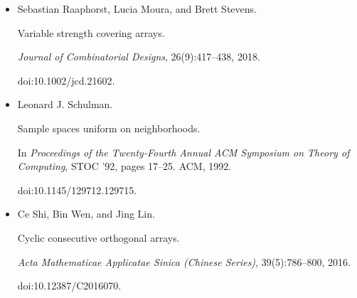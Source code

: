 \begin{itemize}
\emph{Theoretical Computer Science}, 800:146–154, 2019.


doi:10.1016/j.tcs.2019.10.022.





\item[] 
[18]

Sebastian Raaphorst, Lucia Moura, and Brett Stevens.


Variable strength covering arrays.


\emph{Journal of Combinatorial Designs}, 26(9):417–438, 2018.


doi:10.1002/jcd.21602.





\item[] 
[19]

Leonard J. Schulman.


Sample spaces uniform on neighborhoods.


In \emph{Proceedings of the Twenty-Fourth Annual ACM Symposium on
Theory of Computing}, STOC ’92, pages 17–25. ACM, 1992.


doi:10.1145/129712.129715.





\item[] 
[20]

Ce Shi, Bin Wen, and Jing Lin.


Cyclic consecutive orthogonal arrays.


\emph{Acta Mathematicae Applicatae Sinica (Chinese Series)},
39(5):786–800, 2016.


doi:10.12387/C2016070.





\end{itemize}

